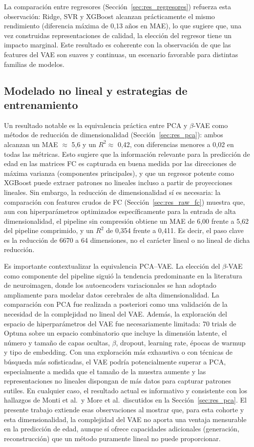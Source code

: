 La comparación entre regresores (Sección~\ref{sec:res_regresores}) refuerza esta observación: Ridge, SVR y XGBoost alcanzan prácticamente el mismo rendimiento (diferencia máxima de 0,13 años en MAE), lo que sugiere que, una vez construidas representaciones de calidad, la elección del regresor tiene un impacto marginal. Este resultado es coherente con la observación de que las features del VAE son suaves y continuas, un escenario favorable para distintas familias de modelos.

\subsection{Modelado no lineal y estrategias de entrenamiento}

Un resultado notable es la equivalencia práctica entre PCA y $\beta$-VAE como métodos de reducción de dimensionalidad (Sección~\ref{sec:res_pca}): ambos alcanzan un MAE $\approx$ 5,6 y un $R^2 \approx$ 0,42, con diferencias menores a 0,02 en todas las métricas. Esto sugiere que la información relevante para la predicción de edad en las matrices FC es capturada en buena medida por las direcciones de máxima varianza (componentes principales), y que un regresor potente como XGBoost puede extraer patrones no lineales incluso a partir de proyecciones lineales. Sin embargo, la reducción de dimensionalidad sí es necesaria: la comparación con features crudos de FC (Sección~\ref{sec:res_raw_fc}) muestra que, aun con hiperparámetros optimizados específicamente para la entrada de alta dimensionalidad, el pipeline sin compresión obtiene un MAE de 6,00 frente a 5,62 del pipeline comprimido, y un $R^2$ de 0,354 frente a 0,411. Es decir, el paso clave es la reducción de 6670 a 64 dimensiones, no el carácter lineal o no lineal de dicha reducción.

Es importante contextualizar la equivalencia PCA--VAE. La elección del $\beta$-VAE como componente del pipeline siguió la tendencia predominante en la literatura de neuroimagen, donde los autoencoders variacionales se han adoptado ampliamente para modelar datos cerebrales de alta dimensionalidad. La comparación con PCA fue realizada a posteriori como una validación de la necesidad de la complejidad no lineal del VAE. Además, la exploración del espacio de hiperparámetros del VAE fue necesariamente limitada: 70 trials de Optuna sobre un espacio combinatorio que incluye la dimensión latente, el número y tamaño de capas ocultas, $\beta$, dropout, learning rate, épocas de warmup y tipo de embedding. Con una exploración más exhaustiva o con técnicas de búsqueda más sofisticadas, el VAE podría potencialmente superar a PCA, especialmente a medida que el tamaño de la muestra aumente y las representaciones no lineales dispongan de más datos para capturar patrones sutiles. En cualquier caso, el resultado actual es informativo y consistente con los hallazgos de Monti et al.\ y More et al.\ discutidos en la Sección~\ref{sec:res_pca}. El presente trabajo extiende esas observaciones al mostrar que, para esta cohorte y esta dimensionalidad, la complejidad del VAE no aporta una ventaja mensurable en la predicción de edad, aunque sí ofrece capacidades adicionales (generación, reconstrucción) que un método puramente lineal no puede proporcionar.

